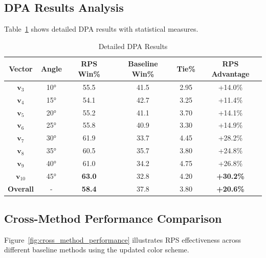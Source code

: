 \documentclass{article} %
\begin{document}
\subsection{DPA Results Analysis}

Table~\ref{tab:dpa_detailed} shows detailed DPA results with statistical measures.

\begin{table}[t]
\centering
\caption{Detailed DPA Results}
\label{tab:dpa_detailed}
\begin{tabular}{c|c|c|c|c|c}
\toprule
\textbf{Vector} & \textbf{Angle} & \textbf{RPS Win\%} & \textbf{Baseline Win\%} & \textbf{Tie\%} & \textbf{RPS Advantage} \\
\midrule
$\mathbf{v}_3$ & 10° & 55.5 & 41.5 & 2.95 & \textcolor[HTML]{2878b5}{+14.0\%} \\
$\mathbf{v}_4$ & 15° & 54.1 & 42.7 & 3.25 & \textcolor[HTML]{2878b5}{+11.4\%} \\
$\mathbf{v}_5$ & 20° & 55.2 & 41.1 & 3.70 & \textcolor[HTML]{2878b5}{+14.1\%} \\
$\mathbf{v}_6$ & 25° & 55.8 & 40.9 & 3.30 & \textcolor[HTML]{2878b5}{+14.9\%} \\
$\mathbf{v}_7$ & 30° & 61.9 & 33.7 & 4.45 & \textcolor[HTML]{c82423}{+28.2\%} \\
$\mathbf{v}_8$ & 35° & 60.5 & 35.7 & 3.80 & \textcolor[HTML]{c82423}{+24.8\%} \\
$\mathbf{v}_9$ & 40° & 61.0 & 34.2 & 4.75 & \textcolor[HTML]{c82423}{+26.8\%} \\
$\mathbf{v}_{10}$ & 45° & \textbf{63.0} & 32.8 & 4.20 & \textcolor[HTML]{c82423}{\textbf{+30.2\%}} \\
\midrule
\textbf{Overall} & - & \textbf{58.4} & 37.8 & 3.80 & \textcolor[HTML]{c82423}{\textbf{+20.6\%}} \\
\bottomrule
\end{tabular}
\end{table}

\subsection{Cross-Method Performance Comparison}

Figure~\ref{fig:cross_method_performance} illustrates RPS effectiveness across different baseline methods using the updated color scheme.
\end{document}
